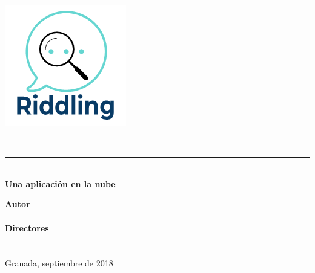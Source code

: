 \begin{titlepage}
 
 
\setlength{\centeroffset}{-0.5\oddsidemargin}
\addtolength{\centeroffset}{0.5\evensidemargin}
\thispagestyle{empty}

\noindent\hspace*{\centeroffset}\begin{minipage}{\textwidth}

\centering

% 

 \vspace{3.3cm}

\includegraphics{imagenes/logo_riddling.png} 
 \vspace{0.5cm}


{\Huge\bfseries \myTitle\\
}
\noindent\rule[-1ex]{\textwidth}{3pt}\\[3.5ex]
{\large\bfseries Una aplicación en la nube\\[4cm]}
\end{minipage}

\vspace{2.5cm}
\noindent\hspace*{\centeroffset}\begin{minipage}{\textwidth}
\centering

\textbf{Autor}\\ \myName\\[2.5ex]
\textbf{Directores}\\\myProf\\[2cm]
\textsc\myDepartment\\
Granada, septiembre de 2018
\end{minipage}

 
\end{titlepage}


